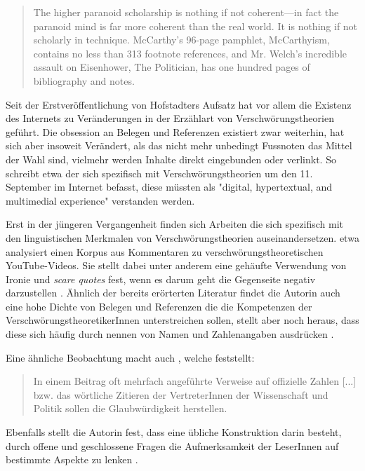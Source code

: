 \begin{quotation}
    The higher paranoid scholarship is nothing if not coherent—in fact the paranoid mind is far more coherent than the real world. It is nothing if not scholarly in technique. McCarthy’s 96-page pamphlet, McCarthyism, contains no less than 313 footnote references, and Mr. Welch’s incredible assault on Eisenhower, The Politician, has one hundred pages of bibliography and notes. \parencite[][37]{hofstadter_2008}
\end{quotation}

Seit der Erstveröffentlichung von Hofstadters Aufsatz hat vor allem die Existenz des Internets zu Veränderungen in der Erzählart von Verschwörungstheorien geführt.
Die obsession an Belegen und Referenzen existiert zwar weiterhin, hat sich aber insoweit Verändert, als das nicht mehr unbedingt Fussnoten das Mittel der Wahl sind, vielmehr werden Inhalte direkt eingebunden oder verlinkt.
So schreibt etwa \textcite{soukup_2008} der sich spezifisch mit Verschwörungstheorien um den 11. September im Internet befasst, diese müssten als "digital, hypertextual, and multimedial experience" \parencite[10]{soukup_2008} verstanden werden.

Erst in der jüngeren Vergangenheit finden sich Arbeiten die sich spezifisch mit den linguistischen Merkmalen von Verschwörungstheorien auseinandersetzen.
\textcite{schafer_2018} etwa analysiert einen Korpus aus Kommentaren zu verschwörungstheoretischen YouTube-Videos.
Sie stellt dabei unter anderem eine gehäufte Verwendung von Ironie und \textit{scare quotes} fest, wenn es darum geht die Gegenseite negativ darzustellen \parencite[235]{schafer_2018}.
Ähnlich der bereits erörterten Literatur findet die Autorin auch eine hohe Dichte von Belegen und Referenzen die die Kompetenzen der VerschwörungstheoretikerInnen unterstreichen sollen, stellt aber noch heraus, dass diese sich häufig durch nennen von Namen und Zahlenangaben ausdrücken \parencite[234]{schafer_2018}.

Eine ähnliche Beobachtung macht auch \textcite{filatkina_2018}, welche feststellt:

\begin{quotation}
    In einem Beitrag oft mehrfach angeführte Verweise auf offizielle Zahlen [...] bzw. das wörtliche Zitieren der VertreterInnen der Wissenschaft und Politik sollen die Glaubwürdigkeit herstellen. \parencite[][208]{filatkina_2018}
\end{quotation}

Ebenfalls stellt die Autorin fest, dass eine übliche Konstruktion darin besteht, durch offene und geschlossene Fragen die Aufmerksamkeit der LeserInnen auf bestimmte Aspekte zu lenken \parencite[][205]{filatkina_2018}.

